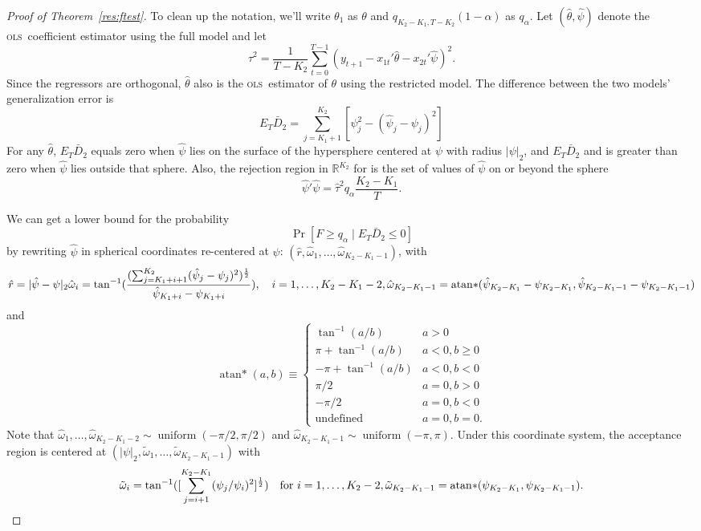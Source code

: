 \documentclass[11pt]{article}
\DeclareMathOperator{\atan}{atan*}
\newcommand{\ols}{\textsc{ols}}
\renewcommand{\Re}{\ensuremath{\mathbb{R}}}
\begin{document}
\begin{proof}[Proof of Theorem~\ref{res:ftest}]
  To clean up the notation, we'll write $\theta_1$ as $\theta$ and
  $q_{K_2-K_1,T-K_2}(1-\alpha)$ as $q_\alpha$.  Let
  $(\hat{\theta}, \hat{\psi})$ denote the \ols\ coefficient estimator
  using the full model and let 
  \[\hat\tau^2 = \frac{1}{T-K_2}\sum_{t=0}^{T-1} (y_{t+1} - x_{1t}'\hat{\theta} -
  x_{2t}'\hat{\psi})^2. \] Since the regressors are orthogonal,
  $\hat\theta$ also is the \ols\ estimator of $\theta$ using the
  restricted model.  The difference between the two models'
  generalization error is
\[
E_T \bar D_2 = \sum_{j=K_1+1}^{K_2} [\psi_j^2 - (\hat{\psi}_j - \psi_j)^2]
\]
For any $\hat{\theta}$, $E_T \bar D_2$ equals zero when
$\hat{\psi}$ lies on the surface of the hypersphere centered at
$\psi$ with radius $|\psi|_2$, and $E_T \bar D_2$ and is greater
than zero when $\hat{\psi}$ lies outside that sphere.
Also, the rejection region in $\Re^{K_2}$ for is the set of values of $\hat{\psi}$
on or beyond the sphere
\[
\hat{\psi}'\hat{\psi} = \hat{\tau}^2 q_\alpha \frac{K_2-K_1}{T}.
\]

We can get a lower bound for the probability
\[\Pr[F \geq q_\alpha \mid E_T \bar{D}_2 \leq 0]\]
by rewriting $\hat{\psi}$ in spherical coordinates re-centered at
$\psi$: $(\hat{r}, \hat{\omega}_1, \dots,
\hat{\omega}_{K_2-K_1-1})$, with 
\[\hat{r} = |\hat{\psi} - \psi|_2 \\
\hat{\omega}_{i} = \tan^{-1}(\frac{(\sum\nolimits_{j=K_1+i+1}^{K_2}(\hat{\psi}_j -
    \psi_j)^2)^{\frac12}}{\hat{\psi}_{K_1+i} - \psi_{K_1+i}}), \quad
  i=1,\dots,K_2-K_1-2, \\
\hat{\omega}_{K_2-K_1-1} =\atan(\hat{\psi}_{K_2-K_1} - \psi_{K_2-K_1},
  \hat{\psi}_{K_2-K_1-1}- \psi_{K_2-K_1-1} )
\]
and
\[
\atan(a, b) \equiv 
\begin{cases}
\tan^{-1}(a/b) & a > 0 \\
\pi + \tan^{-1}(a/b) & a < 0, b \geq 0 \\
-\pi + \tan^{-1}(a/b) & a < 0, b < 0 \\
\pi/2 & a = 0, b > 0 \\
- \pi/2 & a = 0, b < 0 \\
\text{undefined} & a = 0, b = 0.
\end{cases}
\]
Note that $\hat{\omega}_1,\dots,\hat{\omega}_{K_2-K_1 - 2} \sim
\operatorname{uniform}(-\pi/2, \pi/2)$ and
$\hat{\omega}_{K_2-K_1-1}\sim \operatorname{uniform}(-\pi, \pi)$.
Under this coordinate system, the acceptance region is centered at
$(|\psi|_2, \tilde{\omega}_1, \dots, \tilde{\omega}_{K_2-K_1-1})$ with
\[
\tilde{\omega}_i = \tan^{-1}([\sum_{j=i+1}^{K_2-K_1}
  (\psi_j/\psi_i)^2]^{\frac12}) \quad \text{for } i = 1,\dots,K_2-2,\\
\tilde{\omega}_{K_2-K_1-1} = \atan(\psi_{K_2-K_1}, \psi_{K_2-K_1-1}).
\]


\end{proof}
\end{document}
